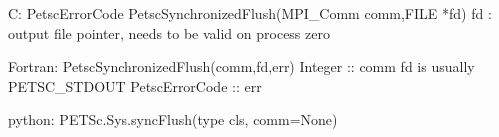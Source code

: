 C:
PetscErrorCode  PetscSynchronizedFlush(MPI_Comm comm,FILE *fd)
fd : output file pointer, needs to be valid on process zero

Fortran:
PetscSynchronizedFlush(comm,fd,err)
Integer :: comm
fd is usually PETSC_STDOUT
PetscErrorCode :: err

python:
PETSc.Sys.syncFlush(type cls, comm=None)
